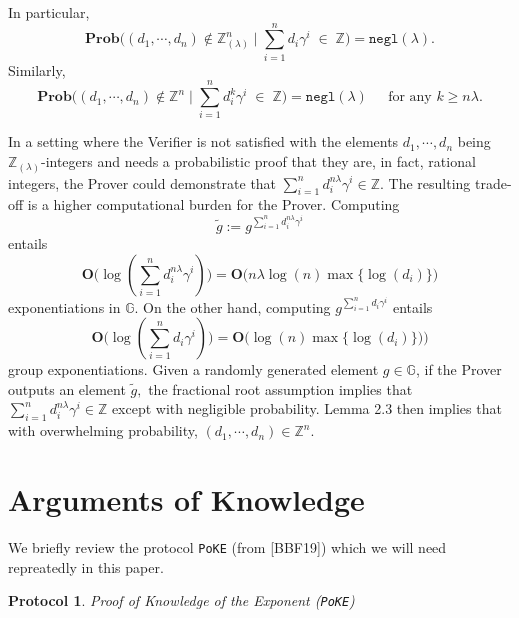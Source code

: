 \documentclass[11pt, lettersize, notitlepage, leqno, footskip=0.6cm]{article}
\newcommand{\bz}{\mathbb Z}
\newcommand{\slim}{\sum\limits}
\newcommand{\ttt}{\texttt}
\newcommand{\negl}{\ttt{{negl}}}
\newcommand{\wti}{\widetilde}
\newcommand{\mb}{\mathbb}
\newcommand{\mbf}{\mathbf}
\newcommand{\lam}{\lambda}
\newcommand{\lamb}{\lambda}
\newcommand{\bzlam}{\bz_{(\lam)}}
\newcommand{\Prob}{\mbf{Prob}}
\newcommand{\vs}{\vspace{-0.15cm}}
\newcommand{\op}{overwhelming probability}
\newtheorem{Prot}[Thm]{Protocol}
\numberwithin{equation}{section}
\begin{document}
\begin{comment}
For the second part, note that \vs $$\Prob\big(\sum\limits_{i=1}^n d_i\gamma_j^i\in \bz\;\forall j\big|\; (d_1,\cdots,d_n)\notin \bz\big ) = \Prob\big(\sum\limits_{i=1}^n d_i\gamma^i\in \bz\big|\; (d_1,\cdots,d_n)\notin \bz\big )^{\lam} = \negl(\lam).$$\end{comment}

\noindent In particular, \vs $$\mbf{Prob}\big((d_1,\cdots, d_n)\notin \bzlam^n \;\Big|\;\sum\limits_{i=1}^n d_i\gamma^i\; \in \;\bz \big) = \negl(\lamb).$$ Similarly, \vs $$ \mbf{Prob}\big((d_1,\cdots, d_n)\notin \bz^n \;\Big|\;\sum\limits_{i=1}^n d_i^{k}\gamma^i\; \in \;\bz \big) = \negl(\lamb)\;\;\;\;\text{ for any } k\geq n\lam. $$


In a setting where the Verifier is not satisfied with the elements $d_1,\cdots, d_n$ being $\bzlam$-integers and needs a probabilistic proof that they are, in fact, rational integers, the Prover could demonstrate that $\sum\limits_{i=1}^n d_i^{n\lam}\gamma^i\in \bz$. The resulting trade-off is a higher computational burden for the Prover. Computing \vs $$\wti{g} := g^{\slim_{i=1}^n d_i^{n\lam} \gamma^i}$$ entails \vs $$\mbf{O}\big(\log(\slim_{i=1}^n d_i^{n\lam} \gamma^i)\big) = \mbf{O}\big(n\lam\log(n)\max\{\log(d_i)\}\big) $$\vs exponentiations in $\mb{G}$. On the other hand, computing $g^{\slim_{i=1}^n d_i \gamma^i}$ entails \vs $$\mbf{O}\big(\log(\slim_{i=1}^n d_i\gamma^i)\big) = \mbf{O}\big(\log(n)\max\{\log(d_i)\}) \big)$$ \vs group exponentiations. Given a randomly generated element $g\in \mb{G}$, if the Prover outputs an element $\wti{g} ,$ the fractional root assumption implies that $\sum\limits_{i=1}^n d_i^{n\lam}\gamma^i\in \bz$ except with negligible probability. Lemma 2.3 then implies that with \op, $(d_1,\cdots,d_n)\in \bz^n$.



\section{\fontsize{12}{12}\selectfont Arguments of Knowledge  }

\noindent We briefly review the protocol \verb|PoKE| (from [BBF19]) which we will need repreatedly in this paper.

\begin{Prot} \normalfont \textit{Proof of Knowledge of the Exponent} (\verb|PoKE|) \end{Prot} \vspace{-0.3cm}
\end{document}
